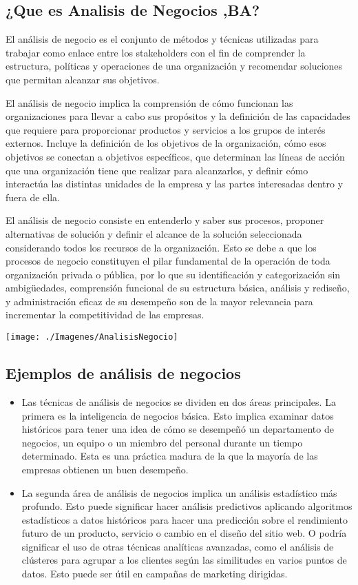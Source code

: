\documentclass[twoside,twocolumn]{article}
\begin{document}
\subsection{¿Que es Analisis de Negocios ,BA?}
El análisis de negocio es el conjunto de métodos y técnicas utilizadas para trabajar como enlace entre los stakeholders con el fin de comprender la estructura, políticas y operaciones de una organización y recomendar soluciones que permitan alcanzar sus objetivos.

El análisis de negocio implica la comprensión de cómo funcionan las organizaciones para llevar a cabo sus propósitos y la definición de las capacidades que requiere para proporcionar productos y servicios a los grupos de interés externos. Incluye la definición de los objetivos de la organización, cómo esos objetivos se conectan a objetivos específicos, que determinan las líneas de acción que una organización tiene que realizar para alcanzarlos, y definir cómo interactúa las distintas unidades de la empresa y las partes interesadas dentro y fuera de ella.

El análisis de negocio consiste en entenderlo y saber sus procesos, proponer alternativas de solución y definir el alcance de la solución seleccionada considerando todos los recursos de la organización. Esto se debe a que los procesos de negocio constituyen el pilar fundamental de la operación de toda organización privada o pública, por lo que su identificación y categorización sin ambigüedades, comprensión funcional de su estructura básica, análisis y rediseño, y administración eficaz de su desempeño son de la mayor relevancia para incrementar la competitividad de las empresas.


\begin{center}
	\texttt{[image: ./Imagenes/AnalisisNegocio]} 
\end{center}


\subsection{Ejemplos de análisis de negocios}

\begin{itemize}	
	\item Las técnicas de análisis de negocios se dividen en dos áreas principales. La primera es la inteligencia de negocios básica. Esto implica examinar datos históricos para tener una idea de cómo se desempeñó un departamento de negocios, un equipo o un miembro del personal durante un tiempo determinado. Esta es una práctica madura de la que la mayoría de las empresas obtienen un buen desempeño.
	\item La segunda área de análisis de negocios implica un análisis estadístico más profundo. Esto puede significar hacer análisis predictivos aplicando algoritmos estadísticos a datos históricos para hacer una predicción sobre el rendimiento futuro de un producto, servicio o cambio en el diseño del sitio web. O podría significar el uso de otras técnicas analíticas avanzadas, como el análisis de clústeres para agrupar a los clientes según las similitudes en varios puntos de datos. Esto puede ser útil en campañas de marketing dirigidas.
\end{itemize} 
\end{document}
